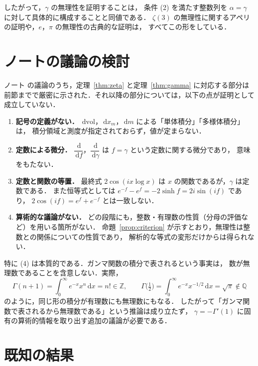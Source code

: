 \documentclass[a4paper,11pt]{ltjsarticle}
\theoremstyle{plain}
\theoremstyle{definition}
\newcommand{\Z}{\mathbb{Z}}
\newcommand{\Q}{\mathbb{Q}}
\newcommand{\dd}{\,\mathrm{d}}
\begin{document}
したがって，$\gamma$ の無理性を証明することは，
条件 (2) を満たす整数列を $\alpha=\gamma$ に対して具体的に構成することと同値である．
$\zeta(3)$ の無理性に関するアペリの証明や，$e$，$\pi$ の無理性の古典的な証明は，
すべてこの形をしている．

\section{ノートの議論の検討}\label{sec:review}

ノート \cite{Note} の議論のうち，定理~\ref{thm:zeta} と定理~\ref{thm:gamma} に対応する部分は
前節までで厳密に示された．それ以降の部分については，以下の点が証明として成立していない．

\begin{enumerate}
  \item \textbf{記号の定義がない．}
        $\dd\mathrm{vol}$，$\dd x_m$，$\dd m$ による「単体積分」「多様体積分」は，
        積分領域と測度が指定されておらず，値が定まらない．
  \item \textbf{定数による微分．}
        $\dfrac{\dd}{\dd f}$，$\dfrac{\dd}{\dd\gamma}$ は $f=\gamma$ という定数に関する微分であり，
        意味をもたない．
  \item \textbf{定数と関数の等置．}
        最終式 $2\cos(ix\log x)$ は $x$ の関数であるが，$\gamma$ は定数である．
        また恒等式としては $e^{-f}-e^{f}=-2\sinh f=2i\sin(if)$ であり，
        $2\cos(if)=e^{f}+e^{-f}$ とは一致しない．
  \item \textbf{算術的な議論がない．}
        どの段階にも，整数・有理数の性質（分母の評価など）を用いる箇所がない．
        命題~\ref{prop:criterion} が示すとおり，無理性は整数との関係についての性質であり，
        解析的な等式の変形だけからは得られない．
\end{enumerate}

特に (4) は本質的である．ガンマ関数の積分で表されるという事実は，
数が無理数であることを含意しない．実際，
\[
  \Gamma(n+1)=\int_0^\infty e^{-x}x^{n}\dd x=n!\in\Z,\qquad
  \Gamma\bigl(\tfrac12\bigr)=\int_0^\infty e^{-x}x^{-1/2}\dd x=\sqrt{\pi}\notin\Q
\]
のように，同じ形の積分が有理数にも無理数にもなる．
したがって「ガンマ関数で表されるから無理数である」という推論は成り立たず，
$\gamma=-\Gamma'(1)$ に固有の算術的情報を取り出す追加の議論が必要である．

\section{既知の結果}
\end{document}
